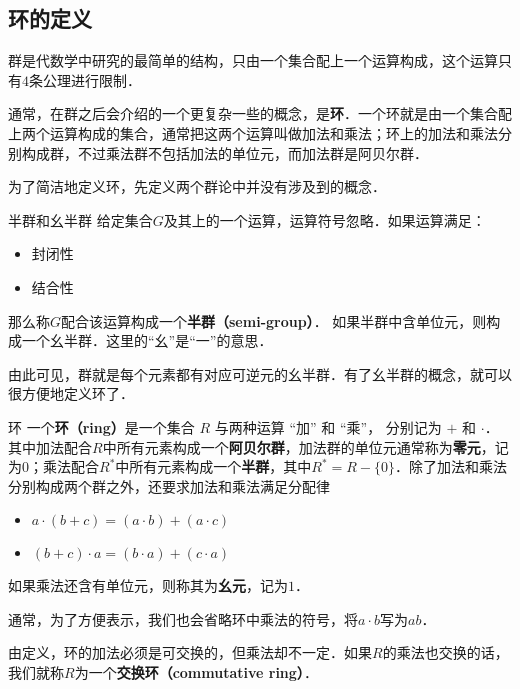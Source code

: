 


\subsection{环的定义}
群是代数学中研究的最简单的结构，只由一个集合配上一个运算构成，这个运算只有$4$条公理进行限制．

通常，在群之后会介绍的一个更复杂一些的概念，是\textbf{环}．一个环就是由一个集合配上两个运算构成的集合，通常把这两个运算叫做加法和乘法；环上的加法和乘法分别构成群，不过乘法群不包括加法的单位元，而加法群是阿贝尔群．

为了简洁地定义环，先定义两个群论中并没有涉及到的概念．

\begin{definition}{半群和幺半群}
给定集合$G$及其上的一个运算，运算符号忽略．如果运算满足：
\begin{itemize}
\item 封闭性
\item 结合性
\end{itemize}
那么称$G$配合该运算构成一个\textbf{半群（semi-group）}．
如果半群中含单位元，则构成一个幺半群．这里的“幺”是“一”的意思．
\end{definition}

由此可见，群就是每个元素都有对应可逆元的幺半群．有了幺半群的概念，就可以很方便地定义环了．

\begin{definition}{环}
一个\textbf{环（ring）}是一个集合 $R$ 与两种运算 “加” 和 “乘”， 分别记为 $+$ 和 $\cdot$． 其中加法配合$R$中所有元素构成一个\textbf{阿贝尔群}，加法群的单位元通常称为\textbf{零元}，记为$0$；乘法配合$R^*$中所有元素构成一个\textbf{半群}，其中$R^*=R-\{0\}$．除了加法和乘法分别构成两个群之外，还要求加法和乘法满足分配律
\begin{itemize}
\item $a \cdot (b + c) = (a \cdot b) + (a \cdot c)$
\item $(b + c) \cdot a = (b \cdot a) + (c \cdot a)$
\end{itemize}
如果乘法还含有单位元，则称其为\textbf{幺元}，记为$1$．
\end{definition}

通常，为了方便表示，我们也会省略环中乘法的符号，将$a\cdot b$写为$ab$．

由定义，环的加法必须是可交换的，但乘法却不一定．如果$R$的乘法也交换的话，我们就称$R$为一个\textbf{交换环（commutative ring）}．

